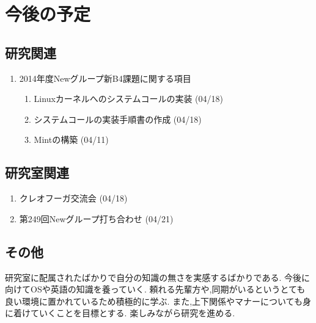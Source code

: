 \documentclass[fleqn, 14pt]{extarticle}
\begin{document}
\section{今後の予定}
\label{sec-4}
\subsection{研究関連}
\label{sec-4-1}
\begin{enumerate}
\item 2014年度Newグループ新B4課題に関する項目
\hfill
\begin{enumerate}

\item Linuxカーネルへのシステムコールの実装
\hfill
(04/18)
\item システムコールの実装手順書の作成
\hfill
(04/18)
\item Mintの構築
\hfill
(04/11)
\end{enumerate}
\end{enumerate}

\subsection{研究室関連}
\label{sec-4-2}
\begin{enumerate}
\item クレオフーガ交流会
\hfill
\label{enum-3}
(04/18)
\item 第249回Newグループ打ち合わせ
\hfill
\label{enum-4}
(04/21)
\end{enumerate}

\subsection{その他}
\label{sec-5}
研究室に配属されたばかりで自分の知識の無さを実感するばかりである.
今後に向けてOSや英語の知識を養っていく.
頼れる先輩方や,同期がいるというとても良い環境に置かれているため積極的に学ぶ.
また,上下関係やマナーについても身に着けていくことを目標とする.
楽しみながら研究を進める.

\end{document}
